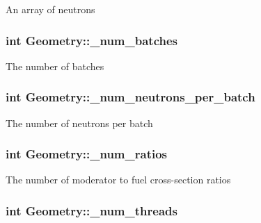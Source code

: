 An array of neutrons \hypertarget{classGeometry_a600fda86b7f3951331ae486548306407}{
\subsubsection[{\-\_\-num\-\_\-batches}]{\setlength{\rightskip}{0pt plus 5cm}int Geometry\-::\-\_\-num\-\_\-batches\hspace{0.3cm}{\ttfamily [private]}}}\label{classGeometry_a600fda86b7f3951331ae486548306407}
The number of batches \hypertarget{classGeometry_ab2f62b285fd3ebc06114db10a3f50167}{
\subsubsection[{\-\_\-num\-\_\-neutrons\-\_\-per\-\_\-batch}]{\setlength{\rightskip}{0pt plus 5cm}int Geometry\-::\-\_\-num\-\_\-neutrons\-\_\-per\-\_\-batch\hspace{0.3cm}{\ttfamily [private]}}}\label{classGeometry_ab2f62b285fd3ebc06114db10a3f50167}
The number of neutrons per batch \hypertarget{classGeometry_a67baa59c9ac0e8819e5844bcef85442d}{
\subsubsection[{\-\_\-num\-\_\-ratios}]{\setlength{\rightskip}{0pt plus 5cm}int Geometry\-::\-\_\-num\-\_\-ratios\hspace{0.3cm}{\ttfamily [private]}}}\label{classGeometry_a67baa59c9ac0e8819e5844bcef85442d}
The number of moderator to fuel cross-\/section ratios \hypertarget{classGeometry_af78593ff6416ad7fc318e4b8692ed77e}{
\subsubsection[{\-\_\-num\-\_\-threads}]{\setlength{\rightskip}{0pt plus 5cm}int Geometry\-::\-\_\-num\-\_\-threads\hspace{0.3cm}{\ttfamily [private]}}}\label{classGeometry_af78593ff6416ad7fc318e4b8692ed77e}
